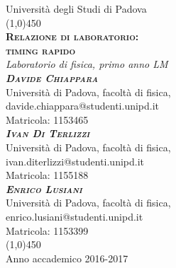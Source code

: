 
\begin{titlepage}

\begin{center}
\LARGE{Università degli Studi di Padova}\\
\line(1,0){450}\\
\vspace{1em}
\Huge{\textsc{\textbf{Relazione di laboratorio:\\ timing rapido}}}\\
\vspace{2em}
\LARGE{\textit{Laboratorio di fisica, primo anno LM}}\\
\vspace{4em}
\huge{\textbf\textsc\textit{{{Davide Chiappara}}}}\\
\vspace{0.5em}
\normalsize{Università di Padova, facoltà di fisica,}\\
\normalsize{davide.chiappara@studenti.unipd.it}\\
\normalsize{Matricola: 1153465}\\
\vspace{1em}
\huge{\textbf\textsc\textit{{{Ivan Di Terlizzi}}}}\\
\vspace{0.5em}
\normalsize{Università di Padova, facoltà di fisica,}\\
\normalsize{ivan.diterlizzi@studenti.unipd.it}\\
\normalsize{Matricola: 1155188}\\
\vspace{1em}
\huge{\textbf\textsc\textit{{{Enrico Lusiani}}}}\\
\vspace{0.5em}
\normalsize{Università di Padova, facoltà di fisica,}\\
\normalsize{enrico.lusiani@studenti.unipd.it}\\
\normalsize{Matricola: 1153399}\\
\vfill
\line(1,0){450}\\
\LARGE{Anno accademico 2016-2017}
\end{center}

\end{titlepage}

